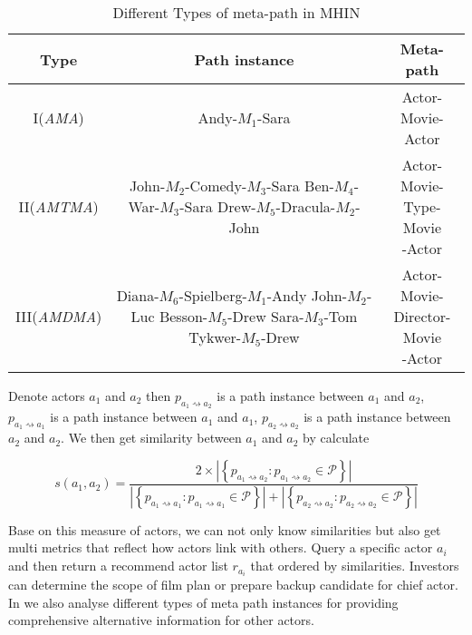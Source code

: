 \begin{table}[!htb]
  \centering
  \begin{tabular}{c|c|c}
  \hline
  Type & Path instance & Meta-path \\
  \hline
  I(\emph{AMA})& Andy-$M_1$-Sara & \tabincell{c}{Actor-\\Movie-Actor}  \\
  \hline
  II(\emph{AMTMA}) & \tabincell{c}{John-$M_2$-Comedy-$M_3$-Sara\\Ben-$M_4$-War-$M_3$-Sara\\Drew-$M_5$-Dracula-$M_2$-John} & \tabincell{c}{Actor-Movie-\\Type-Movie\\-Actor} \\
  \hline
  III(\emph{AMDMA}) & \tabincell{c}{Diana-$M_6$-Spielberg-$M_1$-Andy\\John-$M_2$-Luc Besson-$M_5$-Drew\\Sara-$M_3$-Tom Tykwer-$M_5$-Drew} & \tabincell{c}{Actor-Movie-\\Director-Movie\\-Actor}\\
  \hline
  \end{tabular}
  \caption{Different Types of meta-path in MHIN}
  \label{tab:metapath}
\end{table}

Denote actors $a_1$ and $a_2$ then $p_{a_1 \rightsquigarrow a_2}$ is a path instance between $a_1$ and $a_2$, $p_{a_1 \rightsquigarrow a_1}$ is a path instance between $a_1$ and $a_1$, $p_{a_2 \rightsquigarrow a_2}$ is a path instance between $a_2$ and $a_2$. We then get similarity between $a_1$ and $a_2$ by calculate

\begin{equation}
  s(a_1,a_2) = \frac{2 \times |\left\{p_{a_1 \rightsquigarrow a_2}: p_{a_1 \rightsquigarrow a_2} \in \mathcal{P} \right\}|}{|\left\{p_{a_1 \rightsquigarrow a_1}: p_{a_1 \rightsquigarrow a_1} \in \mathcal{P} \right\}| + |\left\{p_{a_2 \rightsquigarrow a_2}: p_{a_2 \rightsquigarrow a_2} \in \mathcal{P} \right\}|}
\end{equation}

Base on this measure of actors, we can not only know similarities but also get multi metrics that reflect how actors link with others. Query a specific actor $a_i$and then return a recommend actor list $r_{a_i}$ that ordered by similarities. Investors can determine the scope of film plan or prepare backup candidate for chief actor. In \system we also analyse different types of meta path instances for providing comprehensive alternative information for other actors.
